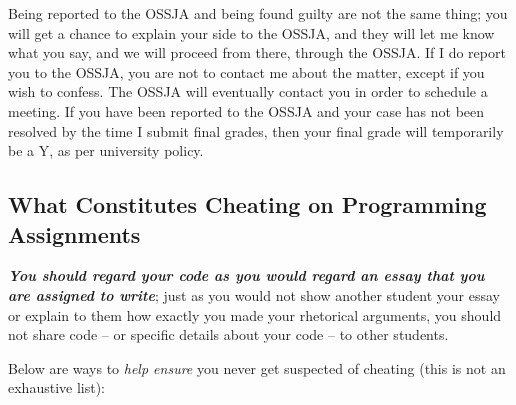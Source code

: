\documentclass{article}
\begin{document}
Being reported to the OSSJA and being found guilty are not the same thing; you will get a chance to explain your side to the OSSJA, and they will let me know what you say, and we will proceed from there, through the OSSJA. If I do report you to the OSSJA, you are not to contact me about the matter, except if you wish to confess. The OSSJA will eventually contact you in order to schedule a meeting. If you have been reported to the OSSJA and your case has not been resolved by the time I submit final grades, then your final grade will temporarily be a Y, as per university policy.

\subsection{What Constitutes Cheating on Programming Assignments}

\textbf{\textit{You should regard your code as you would regard an essay that you are assigned to write}}; just as you would not show another student your essay or explain to them how exactly you made your rhetorical arguments, you should not share code -- or specific details about your code -- to other students.

Below are ways to \textit{help ensure} you never get suspected of cheating (this is not an exhaustive list):
\end{document}
